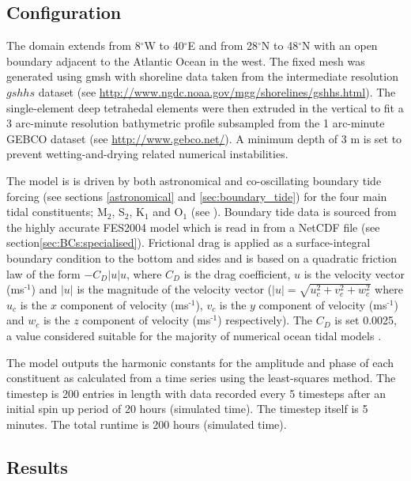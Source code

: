 \subsection{Configuration}

The domain extends from 8$^\circ$W to 40$^\circ$E and from 28$^\circ$N to 48$^\circ$N with an open boundary adjacent to the Atlantic
Ocean in the west. The fixed mesh was generated using gmsh with shoreline data taken from the intermediate resolution $gshhs$
dataset (see \url{http://www.ngdc.noaa.gov/mgg/shorelines/gshhs.html}). The single-element deep tetrahedal elements were then
extruded in the vertical to fit a 3 arc-minute resolution bathymetric profile subsampled from the 1 arc-minute GEBCO dataset     
(see \url{http://www.gebco.net/}). A minimum depth of 3 m  is set to prevent wetting-and-drying related numerical instabilities.

The model is is driven by both astronomical and co-oscillating boundary tide forcing (see sections \ref{astronomical} and \ref{sec:boundary_tide})
for the four main tidal constituents; M$_{\text{2}}$, S$_{\text{2}}$, K$_{\text{1}}$ and O$_{\text{1}}$ (see \citealp{Schwiderski1980,Wells2008}).
Boundary tide data is sourced from the highly accurate FES2004 model \citep{Lyard2006} which is read in from a NetCDF file (see section\ref{sec:BCs:specialised}). 
Frictional drag is applied as a surface-integral boundary condition to the bottom and sides and is based on a quadratic friction law 
of the form $-C_{D}|u|u$, where $C_{D}$ is the drag coefficient, $u$ is the velocity vector 
(ms$^{\text{-1}}$) and $|u|$ is the magnitude of the velocity vector ($|u|=\sqrt{u_{c}^{2}+v_{c}^{2}+w_{c}^{2}}$ where $u_{c}$ is the $x$ component of 
velocity (ms$^{\text{-1}}$), 
$v_{c}$ is the $y$ component of velocity (ms$^{\text{-1}}$) and $w_{c}$ is the 
$z$ component of velocity (ms$^{\text{-1}}$) respectively). 
The $C_{D}$ is set 0.0025, a value considered suitable for the majority of numerical ocean tidal models \citep{Wells2008}. 

The model outputs the harmonic constants for the amplitude and phase of each constituent as calculated from a time series using the least-squares
method. The timestep is 200 entries in length with data recorded every 5 timesteps after an initial spin up period of 20 hours (simulated time). 
The timestep itself is 5 minutes. The total runtime is 200 hours (simulated time).


\subsection{Results}

